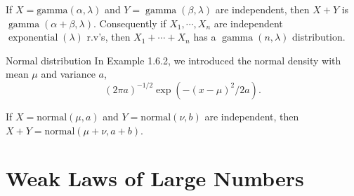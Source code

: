 \documentclass[../main.tex]{subfiles}
\begin{document}
\begin{theorem}{}{}
    If \(  X = \mathrm{gamma}\left( \alpha , \lambda  \right)   \) and \(  Y= \operatorname{gamma}\left( \beta , \lambda  \right)   \) are independent, then \(  X+ Y  \)    is \(  \operatorname{gamma}\left( \alpha + \beta , \lambda  \right)   \). Consequently if \(   X_1,\cdots,X_n   \) are independent \(  \operatorname{exponential}\left(  \lambda  \right)    \) r.v's, then \(  X_1+ \cdots + X_{n}  \) has a \(  \operatorname{gamma}\left( n, \lambda  \right)   \) distribution.      
\end{theorem}

\begin{example}{Normal distribution}{}
In Example 1.6.2, we introduced the normal
density with mean $\mu$ and variance $a$,
\[
(2\pi a)^{-1/2} \exp(-(x - \mu)^2/2a).
\]
\end{example}

\begin{theorem}{}{}
If $X = \text{normal}(\mu, a)$ and $Y = \text{normal}(\nu, b)$ are independent, then $X + Y = \text{normal}(\mu + \nu, a + b)$.
\end{theorem}

\section{Weak Laws of Large Numbers}
\end{document}
